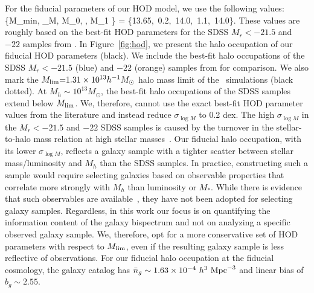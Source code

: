 For the fiducial parameters of our HOD model, we use the following values: 
\beq \label{eq:hod_fid}
\{\log M_{\rm min}, \sigma_{\log M}, \log M_0, \alpha, \log M_1 \} = \{13.65,~0.2,~14.0,~1.1,~14.0\}.
\eeq
These values are roughly based on the best-fit HOD parameters for the SDSS $M_r
< -21.5$ and $-22$ samples from \cite{zheng2007}. 
In Figure~\ref{fig:hod}, we present the halo occupation of our fiducial 
HOD parameters (black). We include the best-fit halo occupations of 
the SDSS $M_r < -21.5$ (blue)  and $-22$ (orange) samples from \cite{zheng2007}
for comparison. We also mark the  $M_{\rm lim}{=}1.31\times10^{13} h^{-1}M_\odot$ 
halo mass limit of the \quij~simulations (black dotted). At $M_h \sim 10^{13} M_\odot$, 
the best-fit halo occupations of the SDSS samples extend below $M_{\rm lim}$.
We, therefore, cannot use the exact best-fit HOD
parameter values from the literature and instead reduce $\sigma_{\log M}$ to 0.2 dex.
The high $\sigma_{\log M}$ in the $M_r < -21.5$ and $-22$ SDSS samples is
caused by the turnover in the stellar-to-halo mass relation at high stellar
masses~\citep{mandelbaum2006, conroy2007, more2011, leauthaud2012, tinker2013,
zu2015, hahn2019b}. Our fiducial halo occupation, with its lower $\sigma_{\log
M}$, reflects a galaxy sample with a tighter scatter between stellar
mass/luminosity and $M_h$ than the SDSS samples.  %
In practice, constructing such a sample would require selecting galaxies based on
observable properties that correlate more strongly with $M_h$ than 
luminosity or $M_*$. While there is evidence that such observables are 
available~\citep[\eg~$L_{\rm sat}$; ][]{alpaslan2019}, they have not been
adopted for selecting galaxy samples. Regardless, in this work
our focus is on quantifying the information content of the galaxy bispectrum 
and not on analyzing a specific observed galaxy sample. We, therefore, opt for 
a more conservative set of HOD parameters with respect to $M_{\rm lim}$, even
if the resulting galaxy sample is less reflective of observations. For our
fiducial halo occupation at the fiducial cosmology, the galaxy catalog has 
$\bar{n}_g \sim 1.63\times 10^{-4}~h^3~{\rm Mpc}^{-3}$ and linear bias of 
$b_g \sim 2.55$.

